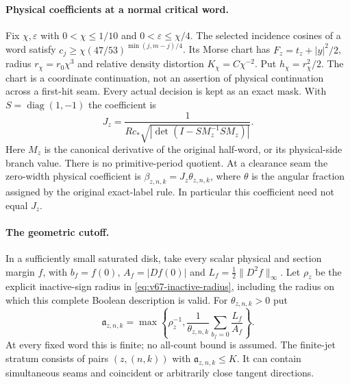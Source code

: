 \documentclass[11pt,reqno]{amsart}
\numberwithin{equation}{section}
\theoremstyle{definition}\newtheorem{definition}[theorem]{Definition}
\theoremstyle{remark}\newtheorem{remark}[theorem]{Remark}
\begin{document}
\paragraph{Physical coefficients at a normal critical word.}
Fix $\chi,\varepsilon$ with $0<\chi\le1/10$ and
$0<\varepsilon\le\chi/4$. The selected incidence cosines of a word
satisfy $c_j\ge\chi(47/53)^{\min(j,m-j)/4}$.
Its Morse chart has $F_z=t_z+|y|^2/2$, radius $r_\chi=r_0\chi^3$
and relative density distortion $K_\chi=C\chi^{-2}$. Put
$h_\chi=r_\chi^2/2$.
The chart is a coordinate continuation, not an assertion of physical
continuation across a first-hit seam. Every actual decision is kept
as an exact mask. With $S=\operatorname{diag}(1,-1)$ the coefficient is
\[
 J_z=\frac{1}{Rc_*\sqrt{|\det(I-SM_z^{-1}SM_z)|}}.
\]
Here $M_z$ is the canonical derivative of the original half-word, or
its physical-side branch value. There is no primitive-period quotient.
At a clearance seam the zero-width physical coefficient is
$\beta_{z,n,k}=J_z\theta_{z,n,k}$, where $\theta$ is the angular
fraction assigned by the original exact-label rule. In particular this
coefficient need not equal $J_z$.

\paragraph{The geometric cutoff.}
In a sufficiently small saturated disk, take every scalar physical and
section margin $f$, with $b_f=f(0)$, $A_f=|Df(0)|$ and
$L_f=\tfrac12\|D^2f\|_\infty$. Let $\rho_z$ be the explicit
inactive-sign radius in \eqref{eq:v67-inactive-radius}, including the
radius on which this complete Boolean description is valid. For
$\theta_{z,n,k}>0$ put
\[
 \mathfrak a_{z,n,k}
 =\max\left\{\rho_z^{-1},\frac{1}{\theta_{z,n,k}}
                   \sum_{b_f=0}\frac{L_f}{A_f}\right\}.
\]
At every fixed word this is finite; no all-count bound is assumed.
The finite-jet stratum consists of pairs $(z,(n,k))$ with
$\mathfrak a_{z,n,k}\le K$. It can contain simultaneous seams and
coincident or arbitrarily close tangent directions.
\end{document}
